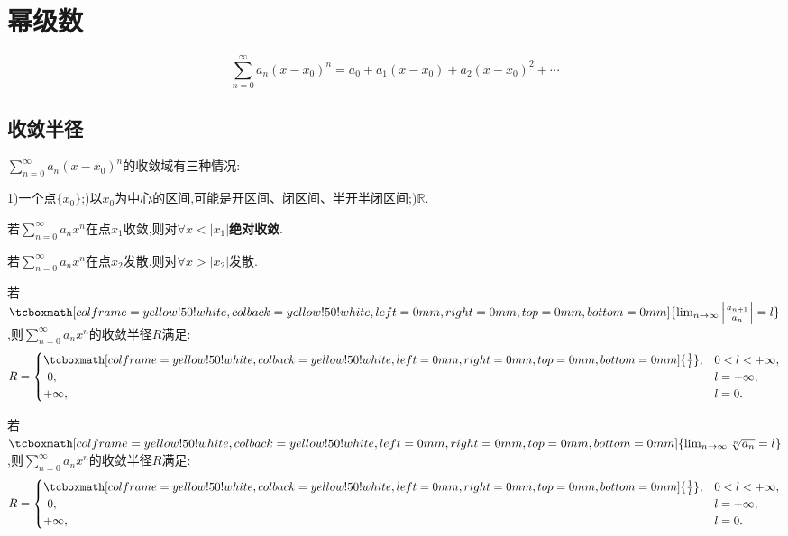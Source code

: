 \documentclass[UTF8]{ctexart}
\newcommand\stress{\tcboxmath[colframe=yellow!50!white,colback=yellow!50!white,left=0mm,right=0mm,top=0mm,bottom=0mm]}
\begin{document}
\section{幂级数}
$$\sum_{n=0}^\infty a_n(x-x_0)^n=a_0+a_1(x-x_0)+a_2(x-x_0)^2+\cdots$$
\subsection{收敛半径}
\noindent$\sum_{n=0}^\infty a_n(x-x_0)^n$的收敛域有三种情况:

1)一个点$\{x_0\}$;)以$x_0$为中心的区间,可能是开区间、闭区间、半开半闭区间;)$\mathbb{R}$.

\begin{tcolorbox}[colframe=green!66!black,title=\subsubsection{阿贝尔定理}]
若$\sum_{n=0}^\infty a_nx^n$在点$x_1$收敛,则对$\forall x<|x_1|${\bf 绝对收敛}.

若$\sum_{n=0}^\infty a_nx^n$在点$x_2$发散,则对$\forall x>|x_2|$发散.
\end{tcolorbox}

\begin{multicols}{2}
    \begin{tcolorbox}[colframe=blue,title=\subsubsection{比式求$R$法}]
        若$\stress{\lim_{n\rightarrow\infty}\left|\frac{a_{n+1}}{a_n}\right|=l}$,则$\sum_{n=0}^\infty a_nx^n$的收敛半径$R$满足:
        $${R=\begin{cases}
            \stress{\frac{1}{l}},&0<l<+\infty,\\
            \ 0,&l=+\infty,\\
            +\infty,&l=0.
        \end{cases}}$$
    \end{tcolorbox}
        
    \begin{tcolorbox}[colframe=blue,title=\subsubsection{根式求$R$法}]
        若$\stress{\lim_{n\rightarrow\infty}\sqrt[n]{a_n}=l}$,则$\sum_{n=0}^\infty a_nx^n$的收敛半径$R$满足:
        $${R=\begin{cases}
            \stress{\frac{1}{l}},&0<l<+\infty,\\
            \ 0,&l=+\infty,\\
            +\infty,&l=0.
        \end{cases}}$$
    \end{tcolorbox}
\end{multicols}
\end{document}
